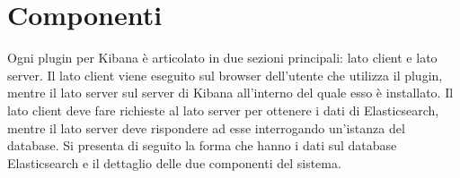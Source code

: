 \section{Componenti}
\label{sec:componenti1}

Ogni plugin per Kibana è articolato in due sezioni principali: lato client e lato server. Il lato client viene eseguito sul browser dell'utente che utilizza il plugin, mentre il lato server sul server di Kibana all'interno del quale esso è installato. Il lato client deve fare richieste al lato server per ottenere i dati di Elasticsearch, mentre il lato server deve rispondere ad esse interrogando un'istanza del database. Si presenta di seguito la forma che hanno i dati sul database Elasticsearch e il dettaglio delle due componenti del sistema.
